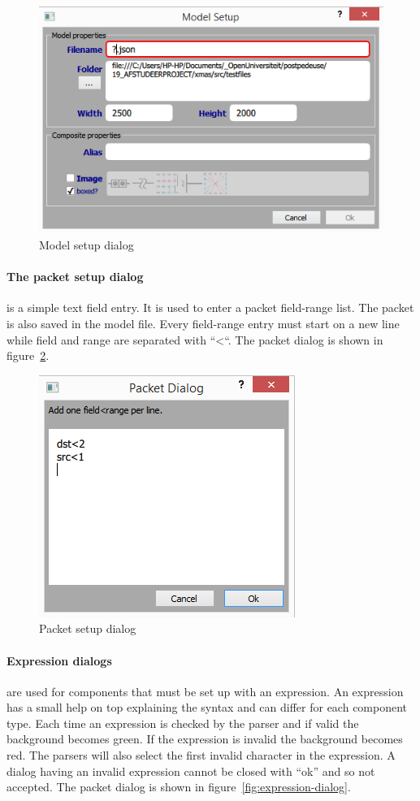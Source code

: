 \begin{figure}[here]
\begin{center}	
	\includegraphics[width=.70\linewidth]{pictures/model-setup}
	\caption{Model setup dialog}
	\label{fig:model-setup}
\end{center}
\end{figure}

\paragraph{The packet setup dialog} is a simple text field entry. It is used to
enter a packet field-range list. The packet is also saved in the model file.
Every field-range entry must start on a new line while field and range are separated with ``\textless ``.
The packet dialog is shown in figure~\ref{fig:packet-setup}.
   
\begin{figure}[here]
\begin{center}	
	\includegraphics[width=.30\linewidth]{pictures/packet-setup}
	\caption{Packet setup dialog}
	\label{fig:packet-setup}
\end{center}
\end{figure}


\paragraph{Expression dialogs} \label{sec:expression-dialogs}
are used for components that must be set up with
an expression. An expression has a small help on top explaining the syntax and
can differ for each component type. Each time an expression is checked by the
parser and if valid the background becomes green. If the expression is invalid
the background becomes red. The parsers will also select the first invalid
character in the expression. A dialog having an invalid expression cannot be
closed with ``ok'' and so not accepted. The packet dialog is shown
in figure~\ref{fig:expression-dialog}.

